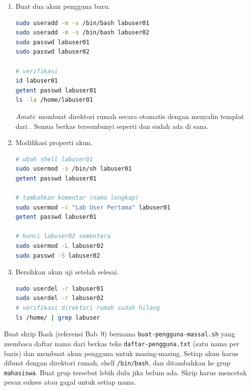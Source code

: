 \begin{enumerate}
    \item Buat dua akun pengguna baru.
\begin{lstlisting}[language=bash, caption={Membuat akun pengguna}]
sudo useradd -m -s /bin/bash labuser01
sudo useradd -m -s /bin/bash labuser02
sudo passwd labuser01
sudo passwd labuser02

# verifikasi
id labuser01
getent passwd labuser01
ls -la /home/labuser01
\end{lstlisting}

    \textit{Amati:}  membuat direktori rumah secara otomatis dengan menyalin templat dari . Semua berkas tersembunyi seperti  dan  sudah ada di sana.

    \item Modifikasi properti akun.
\begin{lstlisting}[language=bash, caption={Modifikasi akun pengguna}]
# ubah shell labuser01
sudo usermod -s /bin/sh labuser01
getent passwd labuser01

# tambahkan komentar (nama lengkap)
sudo usermod -c "Lab User Pertama" labuser01
getent passwd labuser01

# kunci labuser02 sementara
sudo usermod -L labuser02
sudo passwd -S labuser02
\end{lstlisting}

    \item Bersihkan akun uji setelah selesai.
\begin{lstlisting}[language=bash, caption={Hapus akun uji}]
sudo userdel -r labuser01
sudo userdel -r labuser02
# verifikasi direktori rumah sudah hilang
ls /home/ | grep labuser
\end{lstlisting}
\end{enumerate}

\begin{challengebox}
Buat skrip Bash (referensi Bab~9) bernama \texttt{buat-pengguna-massal.sh} yang membaca daftar nama dari berkas teks \texttt{daftar-pengguna.txt} (satu nama per baris) dan membuat akun pengguna untuk masing-masing. Setiap akun harus dibuat dengan direktori rumah, shell \texttt{/bin/bash}, dan ditambahkan ke grup \texttt{mahasiswa}. Buat grup tersebut lebih dulu jika belum ada. Skrip harus mencetak pesan sukses atau gagal untuk setiap nama.
\end{challengebox}


